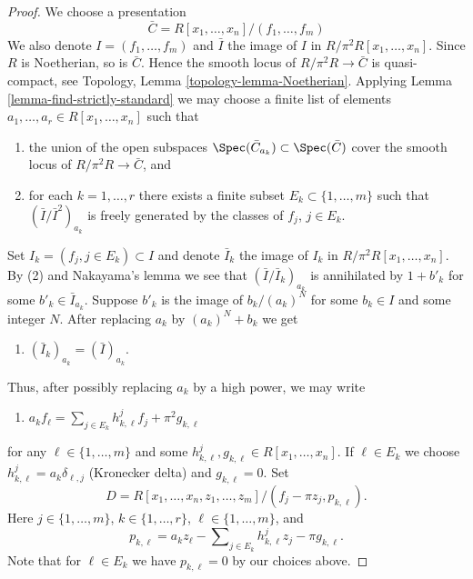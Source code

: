 \begin{proof}
We choose a presentation
$$
\bar C = R[x_1, \ldots, x_n]/(f_1, \ldots, f_m)
$$
We also denote $I = (f_1, \ldots, f_m)$ and $\bar I$ the image of
$I$ in $R/\pi^2R[x_1, \ldots, x_n]$. Since $R$ is Noetherian, so is
$\bar C$. Hence the smooth locus of $R/\pi^2 R \to \bar C$
is quasi-compact, see
Topology, Lemma \ref{topology-lemma-Noetherian}.
Applying
Lemma \ref{lemma-find-strictly-standard}
we may choose a finite list of elements
$a_1, \ldots, a_r \in R[x_1, \ldots, x_n]$ such that
\begin{enumerate}
\item the union of the open subspaces
$\Spec(\bar C_{a_k}) \subset \Spec(\bar C)$
cover the smooth locus of $R/\pi^2 R \to \bar C$, and
\item for each $k = 1, \ldots, r$ there exists a finite subset
$E_k \subset \{1, \ldots, m\}$ such that
$(\bar I/\bar I^2)_{a_k}$ is freely generated by the classes of
$f_j$, $j \in E_k$.
\end{enumerate}
Set $I_k = (f_j, j \in E_k) \subset I$ and denote $\bar I_k$ the
image of $I_k$ in $R/\pi^2R[x_1, \ldots, x_n]$.
By (2) and Nakayama's lemma we see that $(\bar I/\bar I_k)_{a_k}$
is annihilated by $1 + b'_k$ for some $b'_k \in \bar I_{a_k}$.
Suppose $b'_k$ is the image of $b_k/(a_k)^N$ for some $b_k \in I$
and some integer $N$. After replacing $a_k$ by $(a_k)^N + b_k$ we get
\begin{enumerate}
\item[(3)] $(\bar I_k)_{a_k} = (\bar I)_{a_k}$.
\end{enumerate}
Thus, after possibly replacing $a_k$ by a high power, we may write
\begin{enumerate}
\item[(4)]
$a_k f_\ell = \sum\nolimits_{j \in E_k} h_{k, \ell}^jf_j + \pi^2 g_{k, \ell}$
\end{enumerate}
for any $\ell \in \{1, \ldots, m\}$ and some
$h_{k, \ell}^j, g_{k, \ell} \in R[x_1, \ldots, x_n]$.
If $\ell \in E_k$ we choose $h_{k, \ell}^j = a_k\delta_{\ell, j}$
(Kronecker delta) and $g_{k, \ell} = 0$. Set
$$
D = R[x_1, \ldots, x_n, z_1, \ldots, z_m]/
(f_j - \pi z_j, p_{k, \ell}).
$$
Here $j \in \{1, \ldots, m\}$, $k \in \{1, \ldots, r\}$,
$\ell \in \{1, \ldots, m\}$, and
$$
p_{k, \ell} = a_k z_\ell - \sum\nolimits_{j \in E_k} h_{k, \ell}^j z_j
- \pi g_{k, \ell}.
$$
Note that for $\ell \in E_k$ we have $p_{k, \ell} = 0$ by our choices above.


\end{proof}

